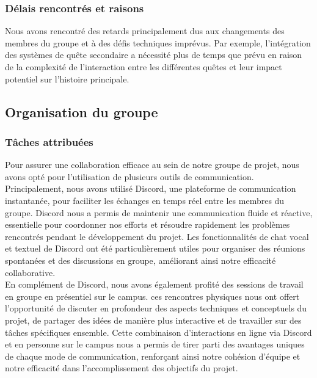 \subsubsection*{Délais rencontrés et raisons}

Nous avons rencontré des retards principalement dus aux changements des membres du groupe et à des défis techniques imprévus. 
Par exemple, l'intégration des systèmes de quête secondaire a nécessité plus de temps que prévu en raison de la complexité de l'interaction entre les différentes quêtes et leur impact potentiel sur l'histoire principale.
\\

\subsection{Organisation du groupe}

\subsubsection{Tâches attribuées}

Pour assurer une collaboration efficace au sein de notre groupe de projet, nous avons opté pour l'utilisation de plusieurs outils de communication. 
Principalement, nous avons utilisé Discord, une plateforme de communication instantanée, pour faciliter les échanges en temps réel entre les membres du groupe. 
Discord nous a permis de maintenir une communication fluide et réactive, essentielle pour coordonner nos efforts et résoudre rapidement les problèmes rencontrés pendant le développement du projet. 
Les fonctionnalités de chat vocal et textuel de Discord ont été particulièrement utiles pour organiser des réunions spontanées et des discussions en groupe, améliorant ainsi notre efficacité collaborative.
\\

En complément de Discord, nous avons également profité des sessions de travail en groupe en présentiel sur le campus. 
ces rencontres physiques nous ont offert l'opportunité de discuter en profondeur des aspects techniques et conceptuels du projet, de partager des idées de manière plus interactive et de travailler sur des tâches spécifiques ensemble. 
Cette combinaison d'interactions en ligne via Discord et en personne sur le campus nous a permis de tirer parti des avantages uniques de chaque mode de communication, renforçant ainsi notre cohésion d'équipe et notre efficacité dans l'accomplissement des objectifs du projet.
\\

